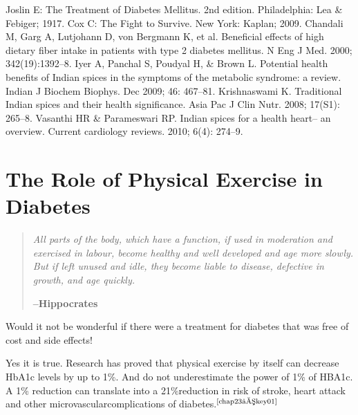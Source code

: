 \clearpage

\begin{thebibliography}{99}
 Joslin E: The Treatment of Diabetes Mellitus. 2nd edition. Phila\-delphia: Lea \& Febiger; 1917.
 Cox C: The Fight to Survive. New York: Kaplan; 2009.
 Chandali M, Garg A, Lutjohann D, von Bergmann K, et al. Beneficial effects of high dietary fiber intake in patients with type 2 diabetes mellitus. N Eng J Med. 2000; 342(19):1392–8.
 Iyer A, Panchal S, Poudyal H, \& Brown L. Potential health benefits of Indian spices in the symptoms of the metabolic syndrome: a review. Indian J Biochem Biophys. Dec 2009; 46: 467–81.
 Krishnaswami K. Traditional Indian spices and their health signi\-ficance. Asia Pac J Clin Nutr. 2008; 17(S1): 265–8.
 Vasanthi HR \& Parameswari RP. Indian spices for a health heart– an overview. Current cardiology reviews. 2010; 6(4): 274–9.
\end{thebibliography}

\newpage

\rhead[\small \em \leftmark]{\small\thepage}
\chapter{The Role of Physical Exercise in Diabetes}\label{chap23}

\begin{quote}
\textit{All parts of the body, which have a function, if used in moderation and exercised in labour, become healthy and well developed and age more slowly. But if left unused and idle, they become liable to disease, defective in growth, and age quickly.}
\vspace{-\topsep}
\begin{flushright}
\textbf{–Hippocrates}
\end{flushright}
\end{quote}
\vspace{-\topsep}

Would it not be wonderful if there were a treatment for diabetes that was free of cost and side effects!

Yes it is true. Research has proved that physical exercise by it\-self can decrease HbA1c levels by up to 1\%. And do not underestimate the power of 1\% of HBA1c. A 1\% reduction can translate into a 21\%\break reduction in risk of stroke, heart attack and other microvascular\break complications of diabetes.$^{\text{\cite{chap23–key01}}}$


